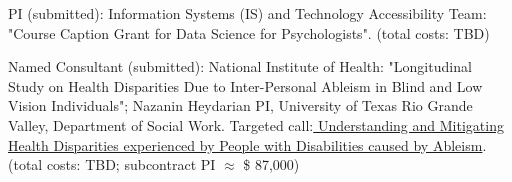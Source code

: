 \item PI (submitted):  Information Systems (IS) and Technology Accessibility Team: "Course Caption Grant for Data Science for Psychologists". (total costs: TBD)

\item Named Consultant (submitted): National Institute of Health: %
"Longitudinal Study on Health Disparities Due to Inter-Personal Ableism in Blind and Low Vision Individuals"; Nazanin Heydarian PI, University of Texas Rio Grande Valley, Department of Social Work. Targeted call:\href{https://grants.nih.gov/grants/guide/rfa-files/RFA-HD-24-007.html}{\color{blue} Understanding and Mitigating Health Disparities experienced by People with Disabilities caused by Ableism}. (total costs: TBD; subcontract PI $\approx$ \$ 87,000)






%
%
